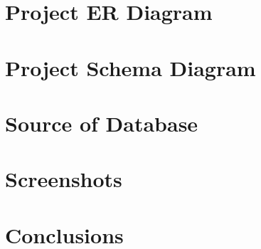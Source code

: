 \documentclass[a4]{article}
\begin{document}
\newpage
\section{Project ER Diagram} %

\newpage
\section{Project Schema Diagram} %

\newpage
\section{Source of Database} %

\newpage
\section{Screenshots} %

\newpage
\section{Conclusions} %
\end{document}
